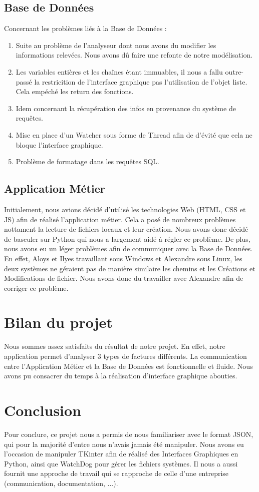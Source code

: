 \documentclass[a4paper, 11pt]{article}
\begin{document}
    \subsection{Base de Données}
    Concernant les problèmes liés à la Base de Données :
    \begin{enumerate}
        \item Suite au problème de l'analyseur dont nous avons du modifier les informations relevées. Nous avons dû faire une refonte de notre modélisation.
        \item Les variables entières et les chaînes étant immuables, il nous a fallu outre-passé la restricition de l'interface graphique pas l'utilisation de l'objet liste. Cela empéché les return des fonctions.
        \item Idem concernant la récupération des infos en provenance du système de requêtes.
        \item Mise en place d'un Watcher sous forme de Thread afin de d'évité que cela ne bloque l'interface graphique.
        \item Problème de formatage dans les requêtes SQL.
    \end{enumerate}

    \subsection{Application Métier}
    Initialement, nous avions décidé d'utilisé les technologies Web (HTML, CSS et JS) afin de réalisé l'application métier. Cela a posé de nombreux problèmes nottament la lecture de fichiers locaux et leur création. Nous avons donc décidé de basculer sur Python qui nous a largement aidé à régler ce problème.
    De plus, nous avons eu un léger problèmes afin de communiquer avec la Base de Données. En effet, Aloys et Ilyes travaillant sous Windows et Alexandre sous Linux, les deux systèmes ne géraient pas de manière similaire les chemins et les Créations et Modifications de fichier. Nous avons donc du travailler avec Alexandre afin de corriger ce problème.

\section{Bilan du projet}
Nous sommes assez satisfaits du résultat de notre projet. En effet, notre application permet d'analyser 3 types de factures différents. La communication entre l'Application Métier et la Base de Données est fonctionnelle et fluide.
Nous avons pu consacrer du temps à la réalisation d'interface graphique abouties.

\section{Conclusion}
Pour conclure, ce projet nous a permis de nous familiariser avec le format JSON, qui pour la majorité d'entre nous n'avais jamais été manipuler. Nous avons eu l'occasion de manipuler TKinter afin de réalisé des Interfaces Graphiques en Python, ainsi que WatchDog pour gérer les fichiers systèmes. Il nous a aussi fournit une approche de travail qui se rapproche de celle d'une entreprise (communication, documentation, ...). 
\end{document}
